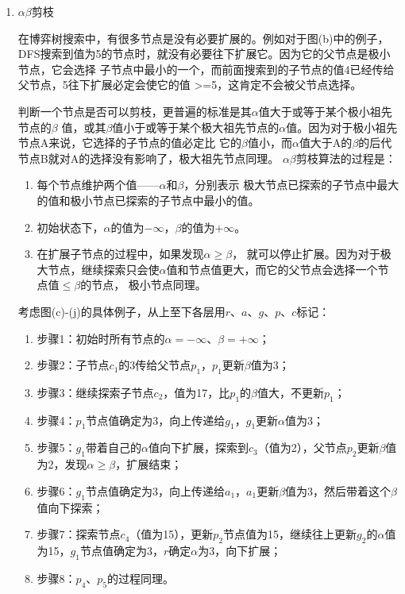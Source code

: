 \documentclass[10pt,letterpaper]{ctexart}
\begin{document}
\begin{enumerate}[itemindent=2.5em,label=\arabic*、]
    \newpage
    \item $\alpha \beta$剪枝
    \par \qquad 在博弈树搜索中，有很多节点是没有必要扩展的。例如对于图(b)中的例子，
    DFS搜索到值为5的节点时，就没有必要往下扩展它。因为它的父节点是极小节点，它会选择
    子节点中最小的一个，而前面搜索到的子节点的值4已经传给父节点，5往下扩展必定会使它的值
    >=5，这肯定不会被父节点选择。
    \par \qquad 判断一个节点是否可以剪枝，更普遍的标准是其$\alpha$值大于或等于某个极小祖先节点的$\beta$
    值，或其$\beta$值小于或等于某个极大祖先节点的$\alpha$值。因为对于极小祖先节点A来说，它选择的子节点的值必定比
    它的$\beta$值小，而$\alpha$值大于A的$\beta$的后代节点B就对A的选择没有影响了，极大祖先节点同理。
    $\alpha \beta$剪枝算法的过程是：
    \begin{enumerate}[itemindent=1.5em,label=(\arabic*)]
      \item 每个节点维护两个值——$\alpha$和$\beta$，分别表示
    极大节点已探索的子节点中最大的值和极小节点已探索的子节点中最小的值。
      \item 初始状态下，$\alpha$的值为$-\infty$，$\beta$的值为$+\infty$。
      \item 在扩展子节点的过程中，如果发现$\alpha \geq \beta$，
    就可以停止扩展。因为对于极大节点，继续探索只会使$\alpha$值和节点值更大，而它的父节点会选择一个节点值$\leq \beta$的节点，
    极小节点同理。
    \end{enumerate}
    考虑图(c)-(j)的具体例子，从上至下各层用$r$、$a$、$g$、$p$、$c$标记：
    \begin{enumerate}[itemindent=1.5em,label=(\arabic*)]
      \item 步骤1：初始时所有节点的$\alpha=-\infty$、$\beta=+\infty$；
      \item 步骤2：子节点$c_1$的3传给父节点$p_1$，$p_1$更新$\beta$值为3；
      \item 步骤3：继续探索子节点$c_2$，值为17，比$p_1$的$\beta$值大，不更新$p_1$；
      \item 步骤4：$p_1$节点值确定为3，向上传递给$g_1$，$g_1$更新$\alpha$值为3；
      \item 步骤5：$g_1$带着自己的$\alpha$值向下扩展，探索到$c_3$（值为2），父节点$p_2$更新$\beta$值为2，发现$\alpha \geq \beta$，扩展结束；
      \item 步骤6：$g_1$节点值确定为3，向上传递给$a_1$，$a_1$更新$\beta$值为3，然后带着这个$\beta$值向下探索；
      \item 步骤7：探索节点$c_4$（值为15），更新$p_2$节点值为15，继续往上更新$g_2$的$\alpha$值为15，$g_1$节点值确定为3，$r$确定$\alpha$为3，向下扩展；
      \item 步骤8：$p_4$、$p_5$的过程同理。
    \end{enumerate}


\end{enumerate}
\end{document}

